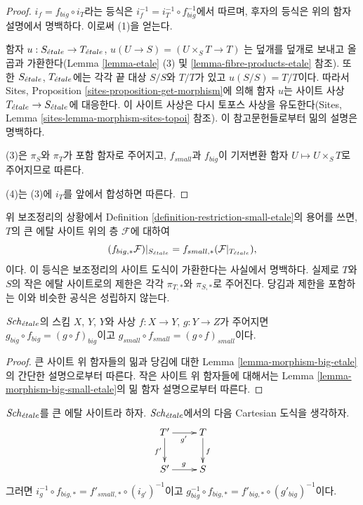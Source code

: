 \begin{proof}
$i_f = f_{big} \circ i_T$라는 등식은
$i_f^{-1} = i_T^{-1} \circ f_{big}^{-1}$에서 따르며, 후자의 등식은 위의
함자 설명에서 명백하다. 이로써 (1)을 얻는다.

\medskip\noindent
함자
$u :
S_{\acute{e}tale}
\to
T_{\acute{e}tale}$, $u(U \to S) = (U \times_S T \to T)$
는 덮개를 덮개로 보내고 올곱과 가환한다(Lemma \ref{lemma-etale} (3)
및 \ref{lemma-fibre-products-etale} 참조). 또한 $S_{\acute{e}tale}$, $T_{\acute{e}tale}$에는
각각 끝 대상 $S/S$와 $T/T$가 있고 $u(S/S) = T/T$이다. 따라서 Sites,
Proposition \ref{sites-proposition-get-morphism}에 의해 함자 $u$는 사이트
사상 $T_{\acute{e}tale} \to S_{\acute{e}tale}$에 대응한다. 이 사이트 사상은 다시 토포스
사상을 유도한다(Sites, Lemma \ref{sites-lemma-morphism-sites-topoi}
참조). 이 참고문헌들로부터 밂의 설명은 명백하다.

\medskip\noindent
(3)은 $\pi_S$와 $\pi_T$가 포함 함자로 주어지고, $f_{small}$과
$f_{big}$이 기저변환 함자 $U \mapsto U \times_S T$로 주어지므로 따른다.

\medskip\noindent
(4)는 (3)에 $i_T$를 앞에서 합성하면 따른다.
\end{proof}

\noindent
위 보조정리의 상황에서 Definition \ref{definition-restriction-small-etale}의
용어를 쓰면, $T$의 큰 에탈 사이트 위의 층 $\mathcal{F}$에 대하여
$$
(f_{big, *}\mathcal{F})|_{S_{\acute{e}tale}} =
f_{small, *}(\mathcal{F}|_{T_{\acute{e}tale}}),
$$
이다. 이 등식은 보조정리의 사이트 도식이 가환한다는 사실에서
명백하다. 실제로 $T$와 $S$의 작은 에탈 사이트로의 제한은 각각
$\pi_{T, *}$와 $\pi_{S, *}$로 주어진다. 당김과 제한을 포함하는 이와
비슷한 공식은 성립하지 않는다.

\begin{lemma}
\label{lemma-composition-etale}
$\mathit{Sch}_{\acute{e}tale}$의 스킴 $X$, $Y$, $Y$와 사상
$f : X \to Y$, $g : Y \to Z$가 주어지면
$g_{big} \circ f_{big} = (g \circ f)_{big}$이고
$g_{small} \circ f_{small} = (g \circ f)_{small}$이다.
\end{lemma}

\begin{proof}
큰 사이트 위 함자들의 밂과 당김에 대한 Lemma
\ref{lemma-morphism-big-etale}의 간단한 설명으로부터 따른다. 작은 사이트
위 함자들에 대해서는 Lemma \ref{lemma-morphism-big-small-etale}의 밂
함자 설명으로부터 따른다.
\end{proof}

\begin{lemma}
\label{lemma-morphism-big-small-cartesian-diagram-etale}
$\mathit{Sch}_{\acute{e}tale}$를 큰 에탈 사이트라 하자. $\mathit{Sch}_{\acute{e}tale}$에서의 다음
Cartesian 도식을 생각하자.
$$
\xymatrix{
T' \ar[r]_{g'} \ar[d]_{f'} & T \ar[d]^f \\
S' \ar[r]^g & S
}
$$
그러면
$i_g^{-1} \circ f_{big, *} = f'_{small, *} \circ (i_{g'})^{-1}$이고
$g_{big}^{-1} \circ f_{big, *} = f'_{big, *} \circ (g'_{big})^{-1}$이다.
\end{lemma}

